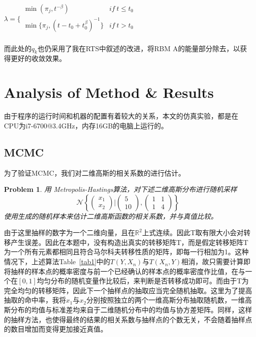 \documentclass[journal,a4paper]{IEEEtran}
\newtheorem{myPro}{\textbf{Problem}}
\begin{document}
	$\lambda = \Big\{ \begin{matrix}
			\min(\pi_j,t^{-\beta}) & if~t \leq t_0 \\
			\min\{\pi_j,(t-t_0+t_0^{\beta})^{-1}\} & if~t > t_0 \\
			\end{matrix} $
	
	而此处的$q_k$也仍采用了我在RTS中叙述的改进，将RBM A的能量部分除去，以获得更好的收敛效果。
	
	\section{Analysis of Method \& Results}
	由于程序的运行时间和机器的配置有着较大的关系，本文的仿真实验，都是在CPU为i7-6700@3.4GHz，内存16GB的电脑上运行的。
	\subsection{MCMC}
	为了验证MCMC，我们对二维高斯的相关系数的进行估计。

	\begin{myPro}
		用 Metropolis-Hastings算法，对下述二维高斯分布进行随机采样
		\begin{equation*}
		\mathscr{N}\left\{\begin{pmatrix}x_1\\x_2\end{pmatrix}\bigg|\begin{pmatrix} 5 \\ 10 \end{pmatrix},\begin{pmatrix} 1 & 1\\1 & 4\end{pmatrix}\right\}
		\end{equation*}
		使用生成的随机样本来估计二维高斯函数的相关系数，并与真值比较。
	\end{myPro}

		由于这里抽样的数字为一个二维向量，且在$\mathbb{R}^2$上式连续。因此T取有限大小会对转移产生误差。因此在本题中，没有构造出真实的转移矩阵T，而是假定转移矩阵T为一个所有元素都相同且符合马尔科夫转移性质的矩阵，即每一行相加为1。这种情况下，上述算法Table~\ref{tab1}中的$ T(Y,X_n) $与$T(X_n,Y)$相消，故只需要计算即将抽样的样本点的概率密度与前一个已经确认的样本点的概率密度作比值，在与一个在$ [0,1] $均匀分布的随机变量作比较后，来判断是否转移成功即可。而由于T为完全均匀的转移矩阵，因此下一个抽样点的抽取应当完全随机抽取。这里为了提高抽取的命中率，我将$x_1$与$x_2$分别按照独立的两个一维高斯分布抽取随机数，一维高斯分布的均值与标准差均来自于二维随机分布中的均值与协方差矩阵。同样，这样的抽样方法，也使得最终的结果的相关系数与抽样点的个数无关，不会随着抽样点的数目增加而变得更加接近真值。
		
\end{document}
